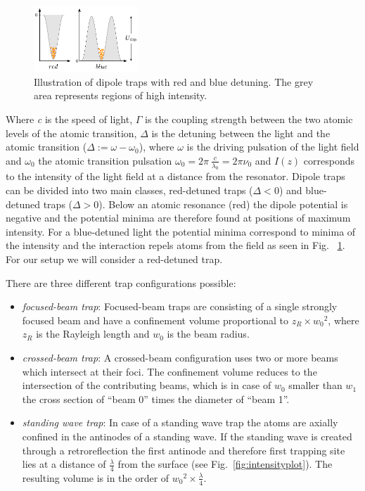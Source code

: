 \begin{figure}
    \centering
    \includegraphics[width=0.35\textwidth]{redbluedetuning}    
    \caption{\label{fig:redbluedetuning} Illustration of dipole traps with red 
    and blue detuning. The grey area represents regions of high intensity.}
\end{figure}
Where \textit{c} is the speed of light, \(\Gamma \) is the coupling strength
between the two atomic levels of the atomic transition, \(\Delta \) is the detuning 
between the light and the atomic transition (\(\Delta := \omega - \omega_0 \)), 
where \(\omega \) is the driving pulsation of the light field and \(\omega_0 \) 
the atomic transition pulsation \(\omega_0=2\pi~\frac{c}{\lambda_0}=2\pi\nu_0 \) 
and \(I(z) \) corresponds to the intensity of the light field at a distance from 
the resonator. Dipole traps can be divided into two main classes, red-detuned 
traps (\(\Delta < 0 \)) and blue-detuned traps (\(\Delta > 0 \)). Below an atomic 
resonance (red) the dipole potential is negative and the potential minima are 
therefore found at positions of maximum intensity. For a blue-detuned light the 
potential minima correspond to minima of the intensity and the interaction repels atoms from the field as seen in Fig.
~\ref{fig:redbluedetuning}. For our setup we will consider a red-detuned trap.
\pagebreak

There are three different trap configurations possible:
\begin{itemize}
    \setlength{\itemsep}{0ex}
    \item \textit{focused-beam trap}: Focused-beam traps are consisting of a 
    single strongly focused beam and have a confinement volume proportional to 
    \(z_R \times {w_0}^2 \), where \(z_R \) is the Rayleigh length and \(w_0 \) 
    is the beam radius.
    \item \textit{crossed-beam trap}: A crossed-beam configuration uses two or 
    more beams which intersect at their foci. The confinement volume reduces to 
    the intersection of the contributing beams, which is in case of \(w_0 \) 
    smaller than \(w_1 \) the cross section of ``beam 0'' times the diameter of 
    ``beam 1''.
    \item \textit{standing wave trap}: In case of a standing wave trap the atoms 
    are axially confined in the antinodes of a standing wave. If the standing 
    wave is created through a retroreflection the first antinode and therefore 
    first trapping site lies at a distance of \(\frac{\lambda}{4} \) from the 
    surface (see Fig.~\ref{fig:intensityplot}). The resulting volume is in the 
    order of \({w_0}^2 \times \frac{\lambda}{4} \).
\end{itemize} 

